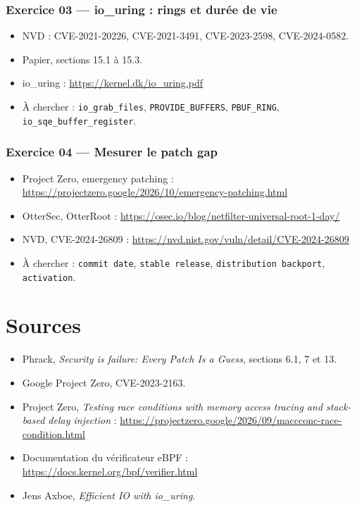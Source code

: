 \documentclass{training}
\begin{document}
\subsection*{Exercice 03 --- io\_uring : rings et durée de vie}
\begin{itemize}
  \item NVD : CVE-2021-20226, CVE-2021-3491, CVE-2023-2598,
        CVE-2024-0582.
  \item Papier, sections 15.1 à 15.3.
  \item io\_uring : \url{https://kernel.dk/io_uring.pdf}
  \item À chercher : \texttt{io\_grab\_files}, \texttt{PROVIDE\_BUFFERS},
        \texttt{PBUF\_RING}, \texttt{io\_sqe\_buffer\_register}.
\end{itemize}

\subsection*{Exercice 04 --- Mesurer le patch gap}
\begin{itemize}
  \item Project Zero, emergency patching :
        \url{https://projectzero.google/2026/10/emergency-patching.html}
  \item OtterSec, OtterRoot :
        \url{https://osec.io/blog/netfilter-universal-root-1-day/}
  \item NVD, CVE-2024-26809 :
        \url{https://nvd.nist.gov/vuln/detail/CVE-2024-26809}
  \item À chercher : \texttt{commit date}, \texttt{stable release},
        \texttt{distribution backport}, \texttt{activation}.
\end{itemize}

\chapter{Sources}
\begin{itemize}
  \item Phrack, \emph{Security is failure: Every Patch Is a Guess},
        sections 6.1, 7 et 13.
  \item Google Project Zero, CVE-2023-2163.
  \item Project Zero, \emph{Testing race conditions with memory access
        tracing and stack-based delay injection} :
        \url{https://projectzero.google/2026/09/maccconc-race-condition.html}
  \item Documentation du vérificateur eBPF :
        \url{https://docs.kernel.org/bpf/verifier.html}
  \item Jens Axboe, \emph{Efficient IO with io\_uring}.
\end{itemize}

\end{document}
